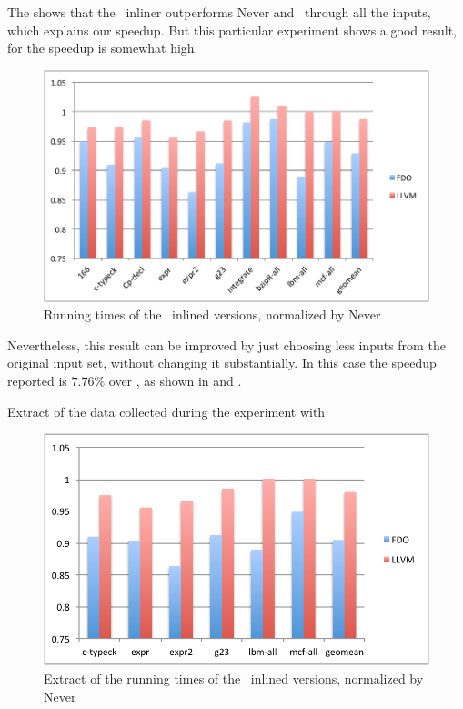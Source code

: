 The  shows that the \FDI\ inliner outperforms Never and \llvm\ through all the inputs, which explains our speedup. But this particular experiment shows a good result, for the speedup is somewhat high.

\begin{figure}
  \centering
  \includegraphics[width=1.00\linewidth]{Figures/speedupgcc}
  \caption{Running times of the \gcc\ inlined versions, normalized by Never}
  \label{fig:speedupgcc}
\end{figure}

Nevertheless, this result can be improved by just choosing less inputs from the original input set, without changing it substantially. In this case the speedup reported is $7.76 \%$ over \llvm, as shown in  and .

\begin{table}
  \centering
  \begin{tiny}
  
  \end{tiny}
  \caption{Extract of the data collected during the experiment with \gcc}
  \label{tab:speedupgcc1}
\end{table}

\begin{figure}
  \centering
  \includegraphics[width=1.00\linewidth]{Figures/speedupgcc1}
  \caption{Extract of the running times of the \gcc\ inlined versions, normalized by Never}
  \label{fig:speedupgcc1}
\end{figure}

